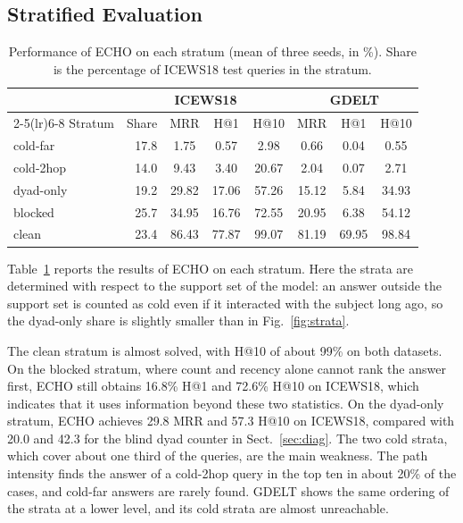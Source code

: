 \documentclass[runningheads]{llncs}
\makeatletter
\newcommand{\model}{ECHO}
\newcommand{\hone}{H@1}
\newcommand{\hten}{H@10}
\makeatother
\begin{document}
\subsection{Stratified Evaluation}

\begin{table}[t]
  \centering
  \caption{Performance of \model{} on each stratum (mean of three seeds, in \%). Share is the percentage of ICEWS18 test queries in the stratum.}
  \label{tab:strata}
  \setlength{\tabcolsep}{5pt}
  \small
  \begin{tabular}{l rccc ccc}
    \toprule
    & \multicolumn{4}{c}{ICEWS18} & \multicolumn{3}{c}{GDELT} \\
    \cmidrule(lr){2-5}\cmidrule(lr){6-8}
    Stratum & Share & MRR & \hone{} & \hten{} & MRR & \hone{} & \hten{} \\
    \midrule
    cold-far   & 17.8 &  1.75 &  0.57 &  2.98 &  0.66 &  0.04 &  0.55 \\
    cold-2hop  & 14.0 &  9.43 &  3.40 & 20.67 &  2.04 &  0.07 &  2.71 \\
    dyad-only  & 19.2 & 29.82 & 17.06 & 57.26 & 15.12 &  5.84 & 34.93 \\
    blocked    & 25.7 & 34.95 & 16.76 & 72.55 & 20.95 &  6.38 & 54.12 \\
    clean      & 23.4 & 86.43 & 77.87 & 99.07 & 81.19 & 69.95 & 98.84 \\
    \bottomrule
  \end{tabular}
\end{table}

Table~\ref{tab:strata} reports the results of \model{} on each stratum. Here the strata are determined with respect to the support set of the model: an answer outside the support set is counted as cold even if it interacted with the subject long ago, so the dyad-only share is slightly smaller than in Fig.~\ref{fig:strata}.

The clean stratum is almost solved, with \hten{} of about 99\% on both datasets. On the blocked stratum, where count and recency alone cannot rank the answer first, \model{} still obtains 16.8\% \hone{} and 72.6\% \hten{} on ICEWS18, which indicates that it uses information beyond these two statistics. On the dyad-only stratum, \model{} achieves 29.8 MRR and 57.3 \hten{} on ICEWS18, compared with 20.0 and 42.3 for the blind dyad counter in Sect.~\ref{sec:diag}. The two cold strata, which cover about one third of the queries, are the main weakness. The path intensity finds the answer of a cold-2hop query in the top ten in about 20\% of the cases, and cold-far answers are rarely found. GDELT shows the same ordering of the strata at a lower level, and its cold strata are almost unreachable.
\end{document}
